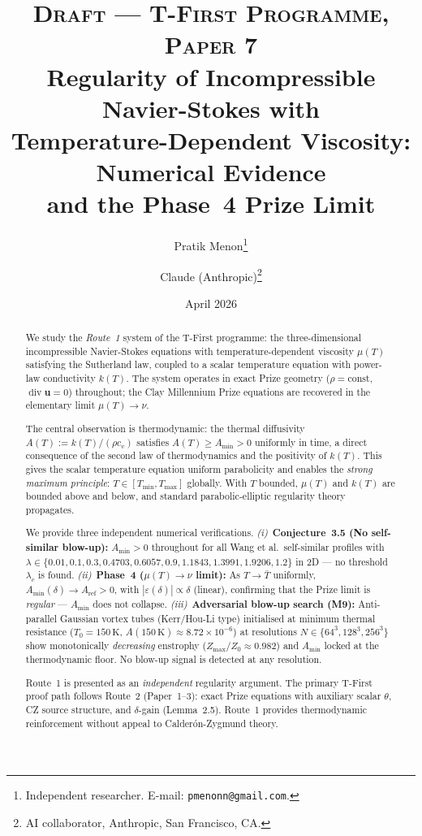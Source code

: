 \documentclass[12pt]{article}
\title{%
  {\large\textsc{Draft — T-First Programme, Paper 7}}\\[8pt]
  \textbf{Regularity of Incompressible Navier-Stokes with\\
  Temperature-Dependent Viscosity: Numerical Evidence\\
  and the Phase~4 Prize Limit}%
}
\author{%
  Pratik Menon\thanks{%
    Independent researcher.
    E-mail: \texttt{pmenonn@gmail.com}.
  }
  \and
  Claude (Anthropic)\thanks{%
    AI collaborator, Anthropic, San Francisco, CA.
  }
}
\date{April 2026}
\newcommand{\eps}{\varepsilon}
\newcommand{\Div}{\operatorname{div}}
\newcommand{\Amin}{A_{\min}}
\begin{document}

\maketitle
\thispagestyle{empty}

\begin{abstract}
We study the \emph{Route~1} system of the T-First programme: the three-dimensional
incompressible Navier-Stokes equations with temperature-dependent viscosity $\mu(T)$
satisfying the Sutherland law, coupled to a scalar temperature equation with
power-law conductivity $k(T)$.  The system operates in exact Prize geometry
($\rho = \mathrm{const}$, $\Div\mathbf{u} = 0$) throughout; the Clay Millennium
Prize equations are recovered in the elementary limit $\mu(T)\to\nu$.

The central observation is thermodynamic: the thermal diffusivity
$A(T) := k(T)/(\rho c_v)$ satisfies $A(T) \geq A_{\min} > 0$ uniformly in time,
a direct consequence of the second law of thermodynamics and the positivity of
$k(T)$.  This gives the scalar temperature equation uniform parabolicity and
enables the \emph{strong maximum principle}: $T \in [T_{\min}, T_{\max}]$ globally.
With $T$ bounded, $\mu(T)$ and $k(T)$ are bounded above and below, and standard
parabolic-elliptic regularity theory propagates.

We provide three independent numerical verifications.
\emph{(i)}~\textbf{Conjecture~3.5 (No self-similar blow-up):} $\Amin > 0$ throughout
for all Wang et al.\ self-similar profiles with $\lambda \in \{0.01, 0.1, 0.3,
0.4703, 0.6057, 0.9, 1.1843, 1.3991, 1.9206, 1.2\}$ in 2D --- no threshold
$\lambda_c$ is found.
\emph{(ii)}~\textbf{Phase~4 ($\mu(T)\to\nu$ limit):} As $T\to\bar{T}$ uniformly,
$A_{\min}(\delta) \to A_{\mathrm{ref}} > 0$, with $|\eps(\delta)| \propto \delta$
(linear), confirming that the Prize limit is \emph{regular} --- $A_{\min}$ does not
collapse.
\emph{(iii)}~\textbf{Adversarial blow-up search (M9):} Anti-parallel Gaussian
vortex tubes (Kerr/Hou-Li type) initialised at minimum thermal resistance
($T_0 = 150\,\mathrm{K}$, $A(150\,\mathrm{K}) \approx 8.72 \times 10^{-6}$) at
resolutions $N \in \{64^3, 128^3, 256^3\}$ show monotonically \emph{decreasing}
enstrophy ($Z_{\max}/Z_0 \approx 0.982$) and $\Amin$ locked at the thermodynamic
floor. No blow-up signal is detected at any resolution.

Route~1 is presented as an \emph{independent} regularity argument.  The primary
T-First proof path follows Route~2 (Paper~1--3): exact Prize equations with auxiliary
scalar $\theta$, CZ source structure, and $\delta$-gain (Lemma~2.5).  Route~1
provides thermodynamic reinforcement without appeal to Calder\'on-Zygmund theory.
\end{abstract}
\end{document}
